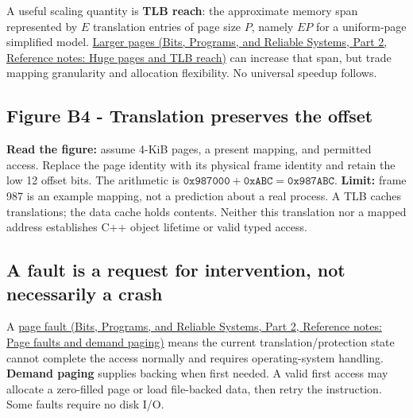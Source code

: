 A useful scaling quantity is \textbf{TLB reach}: the approximate memory span represented by \(E\) translation entries of page size \(P\), namely \(EP\) for a uniform-page simplified model. \href{../01-Bits-Programs-and-Reliable-Systems-P02/main.pdf\#appendix-ce688d1acdab}{Larger pages (Bits, Programs, and Reliable Systems, Part 2, Reference notes: Huge pages and TLB reach)} can increase that span, but trade mapping granularity and allocation flexibility. No universal speedup follows.

\subsection{Figure B4 - Translation preserves the offset}\label{05-engine-i-ch002-figure-b4---translation-preserves-the-offset}

\hypertarget{05-engine-i-ch002-figure-b4---translation-preserves-the-offset}{}


\textbf{Read the figure:} assume 4-KiB pages, a present mapping, and permitted access. Replace the page identity with its physical frame identity and retain the low 12 offset bits. The arithmetic is \(\mathtt{0x987000}+\mathtt{0xABC}=\mathtt{0x987ABC}\). \textbf{Limit:} frame 987 is an example mapping, not a prediction about a real process. A TLB caches translations; the data cache holds contents. Neither this translation nor a mapped address establishes C++ object lifetime or valid typed access.

\subsection{A fault is a request for intervention, not necessarily a crash}\label{05-engine-i-ch002-a-fault-is-a-request-for-intervention-not-necessarily-a-crash}

\hypertarget{05-engine-i-ch002-a-fault-is-a-request-for-intervention-not-necessarily-a-crash}{}

A \href{../01-Bits-Programs-and-Reliable-Systems-P02/main.pdf\#appendix-cc0909a7ef14}{page fault (Bits, Programs, and Reliable Systems, Part 2, Reference notes: Page faults and demand paging)} means the current translation/protection state cannot complete the access normally and requires operating-system handling. \textbf{Demand paging} supplies backing when first needed. A valid first access may allocate a zero-filled page or load file-backed data, then retry the instruction. Some faults require no disk I/O.


